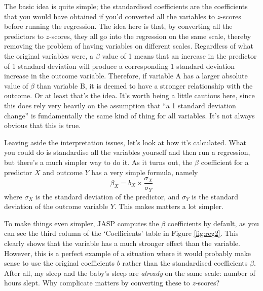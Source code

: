 The basic idea is quite simple; the standardised coefficients are the coefficients that you would have obtained if you'd converted all the variables to $z$-scores before running the regression.  The idea here is that, by converting all the predictors to $z$-scores, they all go into the regression on the same scale, thereby removing the problem of having variables on different scales. Regardless of what the original variables were, a $\beta$ value of 1 means that an increase in the predictor of 1 standard deviation will produce a corresponding 1 standard deviation increase in the outcome variable. Therefore, if variable A has a larger absolute value of $\beta$ than variable B, it is deemed to have a stronger relationship with the outcome. Or at least that's the idea. It's worth being a little cautious here, since this does rely very heavily on the assumption that ``a 1 standard deviation change'' is fundamentally the same kind of thing for all variables. It's not always obvious that this is true.  

\vspace{0.5cm}
\begin{mdframed}[style=MyFrame,nobreak=false]
Leaving aside the interpretation issues, let's look at how it's calculated. What you could do is standardise all the variables yourself and then run a regression, but there's a much simpler way to do it. As it turns out, the $\beta$ coefficient for a predictor $X$ and outcome $Y$ has a very simple formula, namely
$$
\beta_X = b_X \times \frac{\sigma_X}{\sigma_Y} 
$$
where $\sigma_X$ is the standard deviation of the predictor, and $\sigma_Y$ is the standard deviation of the outcome variable $Y$. This makes matters a lot simpler. 
\end{mdframed}

To make things even simpler, JASP computes the $\beta$ coefficients by default, as you can see the third column of the `Coefficients' table in Figure \ref{fig:reg2}. This clearly shows that the  variable has a much stronger effect than the  variable. However, this is a perfect example of a situation where it would probably make sense to use the original coefficients $b$ rather than the standardised coefficients $\beta$. After all, my sleep and the baby's sleep are {\it already} on the same scale: number of hours slept. Why complicate matters by converting these to $z$-scores?


